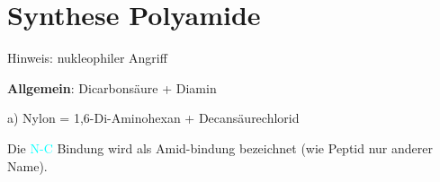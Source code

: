 \section{Synthese Polyamide}
Hinweis: nukleophiler Angriff

\textbf{Allgemein}: Dicarbonsäure + Diamin

a) Nylon = 1,6-Di-Aminohexan + Decansäurechlorid


Die \textcolor{cyan}{N-C} Bindung wird als Amid-bindung bezeichnet (wie Peptid nur anderer Name).


